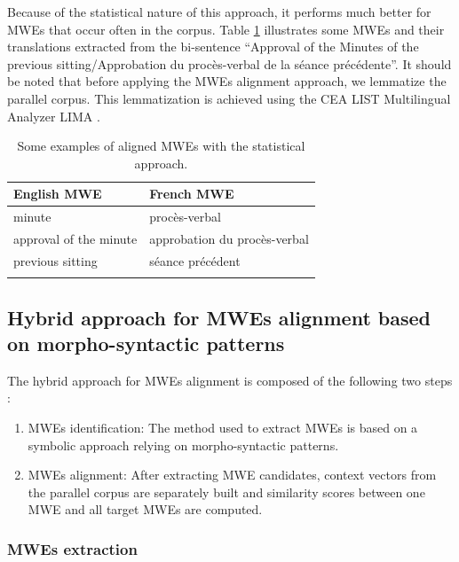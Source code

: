 \documentclass[output=paper,modfonts,nonflat]{langsci/langscibook}
\begin{document}
Because of the statistical nature of this approach, it performs much better for MWEs that occur often in the corpus. Table \ref{MWEexamples} illustrates some MWEs and their translations extracted from the bi-sentence “Approval of the Minutes of the previous sitting/Approbation du procès-verbal de la séance précédente”. It should be noted that before applying the MWEs alignment approach, we lemmatize the parallel corpus. This lemmatization is achieved using the CEA LIST Multilingual Analyzer LIMA  \citep{besancon2010}.

\begin{table}
\caption{Some examples of aligned MWEs with the statistical approach.}
\label{MWEexamples}
 \begin{tabular}{ll} 
  \lsptoprule
            English MWE& French MWE \\ 
  \midrule
minute & procès-verbal \\
approval of the minute & approbation du procès-verbal \\
previous sitting & séance précédent \\
  \lspbottomrule
 \end{tabular}
\end{table}

\subsection{Hybrid approach for MWEs alignment based on morpho-syntactic patterns} 
The hybrid approach for MWEs alignment is composed of the following two steps \citep{bouamor2012,bouamor2012automatic,bouamor2012identifying}:
\begin{enumerate}
 \item MWEs identification: The method used to extract MWEs is based on a symbolic approach relying on morpho-syntactic patterns.
\item MWEs alignment: After extracting MWE candidates, context vectors from the parallel corpus are separately built and similarity scores between one MWE and all target MWEs are computed.
\end{enumerate}

\subsubsection{MWEs extraction}
\end{document}
